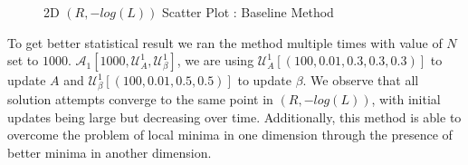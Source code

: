 \begin{figure}[H]
\begin{minipage}[t]{0.5511\textwidth}
        \captionsetup{font=tiny}
        \caption{2D $(R,-log(L))$ Scatter Plot : Baseline Method}
        \label{fig:corr_matrix_ts_qrt_data}
    \end{minipage}
\end{figure}
To get better statistical result we ran the method multiple times with value of $N$ set to  $1000$. $\mathcal{A}_{1}[1000,\mathcal{U}^{1}_{A},\mathcal{U}^{1}_{\beta}]$, we are using $\mathcal{U}^{1}_{A}[(100,0.01,0.3,0.3,0.3)]$ to update $A$ and $\mathcal{U}^{1}_{\beta}[(100,0.01,0.5,0.5)]$ to update $\beta$.  We observe that all solution attempts converge to the same point in $(R,-log(L))$, with initial updates being large but decreasing over time. Additionally, this method is able to overcome the problem of local minima in one dimension through the presence of better minima in another dimension.
